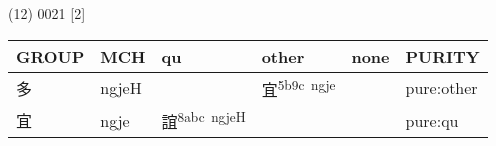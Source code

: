 \documentclass[14pt,a4paper]{scrartcl}
\begin{document}
(12) 0021 {[}2{]}

\begin{longtable}[c]{@{}llllll@{}}
\toprule
\begin{minipage}[b]{0.14\columnwidth}\raggedright\strut
GROUP
\strut\end{minipage} &
\begin{minipage}[b]{0.14\columnwidth}\raggedright\strut
MCH
\strut\end{minipage} &
\begin{minipage}[b]{0.14\columnwidth}\raggedright\strut
qu
\strut\end{minipage} &
\begin{minipage}[b]{0.14\columnwidth}\raggedright\strut
other
\strut\end{minipage} &
\begin{minipage}[b]{0.14\columnwidth}\raggedright\strut
none
\strut\end{minipage} &
\begin{minipage}[b]{0.14\columnwidth}\raggedright\strut
PURITY
\strut\end{minipage}\tabularnewline
\midrule
\endhead
\begin{minipage}[t]{0.14\columnwidth}\raggedright\strut
多
\strut\end{minipage} &
\begin{minipage}[t]{0.14\columnwidth}\raggedright\strut
ngjeH
\strut\end{minipage} &
\begin{minipage}[t]{0.14\columnwidth}\raggedright\strut
\strut\end{minipage} &
\begin{minipage}[t]{0.14\columnwidth}\raggedright\strut
宜\textsuperscript{5b9c~ngje}
\strut\end{minipage} &
\begin{minipage}[t]{0.14\columnwidth}\raggedright\strut
\strut\end{minipage} &
\begin{minipage}[t]{0.14\columnwidth}\raggedright\strut
pure:other
\strut\end{minipage}\tabularnewline
\begin{minipage}[t]{0.14\columnwidth}\raggedright\strut
宜
\strut\end{minipage} &
\begin{minipage}[t]{0.14\columnwidth}\raggedright\strut
ngje
\strut\end{minipage} &
\begin{minipage}[t]{0.14\columnwidth}\raggedright\strut
誼\textsuperscript{8abc~ngjeH}
\strut\end{minipage} &
\begin{minipage}[t]{0.14\columnwidth}\raggedright\strut
\strut\end{minipage} &
\begin{minipage}[t]{0.14\columnwidth}\raggedright\strut
\strut\end{minipage} &
\begin{minipage}[t]{0.14\columnwidth}\raggedright\strut
pure:qu
\strut\end{minipage}\tabularnewline
\bottomrule
\end{longtable}
\end{document}
